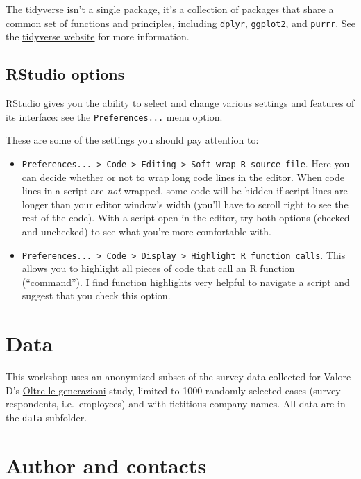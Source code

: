 \documentclass[
]{book}
\providecommand{\tightlist}{%
  \setlength{\itemsep}{0pt}\setlength{\parskip}{0pt}}
\begin{document}
The tidyverse isn't a single package, it's a collection of packages that share a common set of functions and principles, including \texttt{dplyr}, \texttt{ggplot2}, and \texttt{purrr}. See the \href{https://www.tidyverse.org/}{tidyverse website} for more information.

\hypertarget{rstudio-options}{%
\subsection{RStudio options}\label{rstudio-options}}

RStudio gives you the ability to select and change various settings and features of its interface: see the \texttt{Preferences...} menu option.

These are some of the settings you should pay attention to:

\begin{itemize}
\tightlist
\item
  \texttt{Preferences...\ \textgreater{}\ Code\ \textgreater{}\ Editing\ \textgreater{}\ Soft-wrap\ R\ source\ file}. Here you can decide whether or not to wrap long code lines in the editor. When code lines in a script are \emph{not} wrapped, some code will be hidden if script lines are longer than your editor window's width (you'll have to scroll right to see the rest of the code). With a script open in the editor, try both options (checked and unchecked) to see what you're more comfortable with.
\item
  \texttt{Preferences...\ \textgreater{}\ Code\ \textgreater{}\ Display\ \textgreater{}\ Highlight\ R\ function\ calls}. This allows you to highlight all pieces of code that call an R function (``command''). I find function highlights very helpful to navigate a script and suggest that you check this option.
\end{itemize}

\hypertarget{data}{%
\section{Data}\label{data}}

This workshop uses an anonymized subset of the survey data collected for Valore D's \href{https://www.valored.it/ricerche/oltre-le-generazioni-esperienze-relazioni-lavoro/}{Oltre le generazioni} study, limited to 1000 randomly selected cases (survey respondents, i.e.~employees) and with fictitious company names. All data are in the \texttt{data} subfolder.

\hypertarget{author-and-contacts}{%
\section{Author and contacts}\label{author-and-contacts}}
\end{document}
